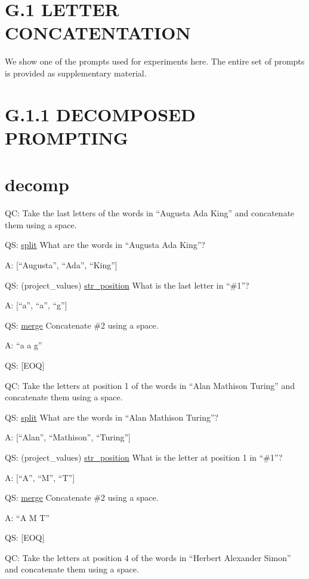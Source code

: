 \documentclass[
]{article}
\begin{document}
\section{G.1 LETTER CONCATENTATION}\label{g.1-letter-concatentation}

We show one of the prompts used for experiments here. The entire set of
prompts is provided as supplementary material.

\section{G.1.1 DECOMPOSED PROMPTING}\label{g.1.1-decomposed-prompting}

\section{decomp}\label{decomp}

QC: Take the last letters of the words in ``Augusta Ada King'' and
concatenate them using a space.

QS: \hyperref[split]{split} What are the words in ``Augusta Ada King''?

A: {[}``Augusta'', ``Ada'', ``King''{]}

QS: (project\_values) \hyperref[str_position]{str\_position} What is the
last letter in ``\#1''?

A: {[}``a'', ``a'', ``g''{]}

QS: \hyperref[merge]{merge} Concatenate \#2 using a space.

A: ``a a g''

QS: {[}EOQ{]}

QC: Take the letters at position 1 of the words in ``Alan Mathison
Turing'' and concatenate them using a space.

QS: \hyperref[split]{split} What are the words in ``Alan Mathison
Turing''?

A: {[}``Alan'', ``Mathison'', ``Turing''{]}

QS: (project\_values) \hyperref[str_position]{str\_position} What is the
letter at position 1 in ``\#1''?

A: {[}``A'', ``M'', ``T''{]}

QS: \hyperref[merge]{merge} Concatenate \#2 using a space.

A: ``A M T''

QS: {[}EOQ{]}

QC: Take the letters at position 4 of the words in ``Herbert Alexander
Simon'' and concatenate them using a space.
\end{document}
